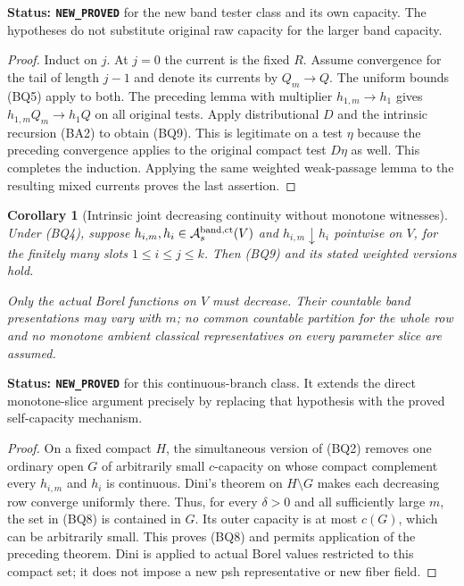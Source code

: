 \documentclass[11pt,a4paper]{article}
\numberwithin{equation}{section}
\newtheorem{corollary}[theorem]{Corollary}
\theoremstyle{definition}
\theoremstyle{remark}
\begin{document}
\noindent\textbf{Status: \texttt{NEW\_PROVED}} for the new
band tester class and its own capacity. The hypotheses do not
substitute original raw capacity for the larger band capacity.

\begin{proof}
Induct on $j$. At $j=0$ the current is the fixed $R$.
Assume convergence for the tail of length $j-1$ and denote
its currents by $Q_m\to Q$. The uniform bounds (BQ5)
apply to both. The preceding lemma with multiplier
$h_{1,m}\to h_1$ gives
$h_{1,m}Q_m\to h_1Q$ on all original tests. Apply
distributional $D$ and the intrinsic recursion (BA2) to obtain
(BQ9). This is legitimate on a test $\eta$ because the
preceding convergence applies to the original compact test
$D\eta$ as well. This completes the induction. Applying the
same weighted weak-passage lemma to the resulting mixed
currents proves the last assertion.
\end{proof}

\begin{corollary}[Intrinsic joint decreasing continuity without monotone witnesses]
\label{cor:r12-intrinsic-band-decreasing-continuity}
Under (BQ4), suppose
$h_{i,m},h_i\in\mathcal A_s^{\rm band,ct}(V)$ and
$h_{i,m}\downarrow h_i$ pointwise on $V$, for the finitely
many slots $1\leq i\leq j\leq k$. Then (BQ9) and its
stated weighted versions hold.

Only the actual Borel functions on $V$ must decrease. Their
countable band presentations may vary with $m$; no common
countable partition for the whole row and no monotone ambient
classical representatives on every parameter slice are assumed.
\end{corollary}

\noindent\textbf{Status: \texttt{NEW\_PROVED}} for this
continuous-branch class. It extends the direct monotone-slice
argument precisely by replacing that hypothesis with the
proved self-capacity mechanism.

\begin{proof}
On a fixed compact $H$, the simultaneous version of (BQ2)
removes one ordinary open $G$ of arbitrarily small $c$-capacity
on whose compact complement every $h_{i,m}$ and $h_i$ is
continuous. Dini's theorem on $H\setminus G$ makes each
decreasing row converge uniformly there. Thus, for every
$\delta>0$ and all sufficiently large $m$, the set in
(BQ8) is contained in $G$. Its outer capacity is at most
$c(G)$, which can be arbitrarily small. This proves (BQ8)
and permits application of the preceding theorem. Dini is
applied to actual Borel values restricted to this compact set;
it does not impose a new psh representative or new fiber field.
\end{proof}
\end{document}

